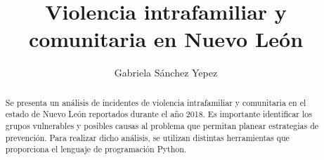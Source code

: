 \documentclass[final,5p,times]{elsarticle}
\begin{document}
\begin{frontmatter}



\title{Violencia intrafamiliar y comunitaria en Nuevo Le\'on}


\author{Gabriela S\'anchez Yepez}

\address{Posgrado en Ingenier\'ia de Sistemas \\
Facultad de Ingenier\'ia Mec\'anica y El\'ectrica\\
Universidad Aut\'onoma de Nuevo Le\'on}

\begin{abstract}
Se presenta un an\'alisis de incidentes de violencia intrafamiliar y comunitaria en el estado de Nuevo Le\'on reportados durante el a\~no 2018. Es importante identificar los grupos vulnerables y posibles causas al problema que permitan planear estrategias de prevenci\'on. Para realizar dicho an\'alisis, se utilizan distintas herramientas que proporciona el lenguaje de programaci\'on Python. %
\end{abstract}




\end{frontmatter}
\end{document}
